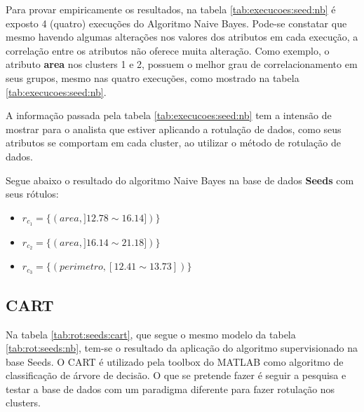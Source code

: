 Para provar empiricamente os resultados, na tabela \ref{tab:execucoes:seed:nb} é exposto  4 (quatro) execuções do Algoritmo Naive Bayes. Pode-se constatar que mesmo havendo algumas alterações nos valores dos atributos em cada execução, a correlação entre os atributos não oferece muita alteração. Como exemplo, o atributo \textbf{area} nos clusters 1 e 2, possuem o melhor grau de correlacionamento em seus grupos, mesmo nas quatro execuções, como mostrado na tabela \ref{tab:execucoes:seed:nb}.

A informação passada pela tabela \ref{tab:execucoes:seed:nb} tem a intensão de mostrar para o analista que estiver aplicando a rotulação de dados, como seus atributos se comportam em cada cluster, ao utilizar  o método de rotulação de dados.

Segue abaixo o resultado do algoritmo Naive Bayes na base de dados \textbf{Seeds} com seus rótulos: 
\begin{itemize}[noitemsep]
 \item ${r_{c_1}=\{ (area, ]12.78 \sim 16.14]) \} }$  
 \item ${r_{c_2}=\{ (area, ]16.14 \sim 21.18]) \} }$
 \item ${r_{c_3}=\{ (perimetro, [12.41 \sim 13.73])\} }$
\end{itemize}


\subsection{CART}\label{cap:resultados:ssec:seed:cart}

Na tabela \ref{tab:rot:seeds:cart}, que segue o mesmo modelo da tabela \ref{tab:rot:seeds:nb}, tem-se o resultado da aplicação do algoritmo supervisionado na base Seeds. O CART é utilizado pela toolbox do MATLAB como algoritmo de classificação de árvore de decisão. O que se pretende fazer é seguir a pesquisa e testar a base de dados com um paradigma  diferente para fazer rotulação nos clusters.

